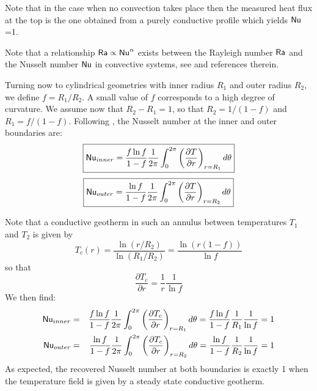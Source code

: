 \begin{itemize}

Note that in the case when no convection takes place then the measured heat flux at the top is 
the one obtained from a purely conductive profile which yields ${\mathsf{Nu}}$=1.

Note that a relationship  ${\mathsf{Ra}} \propto {\mathsf{Nu}}^\alpha $ exists between the Rayleigh 
number ${\mathsf{Ra}}$ and the Nusselt number ${\mathsf{Nu}}$ in convective systems, see \cite{wodd09} and references therein. 

Turning now to cylindrical geometries with inner radius $R_1$ and outer radius $R_2$, 
we define $f=R_1/R_2$. A small value of $f$ corresponds to a high
degree of curvature. We assume now that $R_2-R_1=1$, so that $R_2=1/(1-f)$ and $R_1=f/(1-f)$. 
Following \cite{jarv93}, the Nusselt number at the inner and outer boundaries are:
\begin{equation}
\boxed{
{\mathsf{Nu}}_{inner} 
=\frac{f \ln f}{1-f} \frac{1}{2\pi} \int_0^{2\pi} \left( \frac{\partial T}{\partial r}\right)_{r=R_1}d\theta
}
\label{eqNuAnnIn}
\end{equation}
\begin{equation}
\boxed{
{\mathsf{Nu}}_{outer} 
= \frac{\ln f}{1-f} \frac{1}{2\pi} \int_0^{2\pi} \left( \frac{\partial T}{\partial r} \right)_{r=R_2} d\theta
}
\label{eqNuAnnOut}
\end{equation}

Note that a conductive geotherm in such an annulus between temperatures $T_1$ and $T_2$ is given by 
\[
T_c(r)=\frac{\ln (r/R_2)}{\ln(R_1/R_2)} = \frac{\ln(r(1-f))}{\ln f}
\]
so that 
\[
\frac{\partial T_c}{\partial r} = \frac{1}{r}\frac{1}{\ln f} 
\]
We then find:
\begin{eqnarray}
{\mathsf{Nu}}_{inner} 
&=& \frac{f \ln f}{1-f} \frac{1}{2\pi} \int_0^{2\pi} \left( \frac{\partial T_c}{\partial r} \right)_{r=R_1} d\theta
= \frac{f \ln f}{1-f} \frac{1}{R_1}\frac{1}{\ln f} 
= 1 \\
{\mathsf{Nu}}_{outer} 
&=& \frac{\ln f}{1-f} \frac{1}{2\pi} \int_0^{2\pi} \left( \frac{\partial T_c}{\partial r} \right)_{r=R_2} d\theta 
= \frac{\ln f}{1-f} \frac{1}{R_2}\frac{1}{\ln f} = 1 
\end{eqnarray}
As expected, the recovered Nusselt number at both boundaries is exactly 1 when the temperature field is
given by a steady state conductive geotherm.


\Literature \cite{hohr87,fuky07}
 

\end{itemize}
